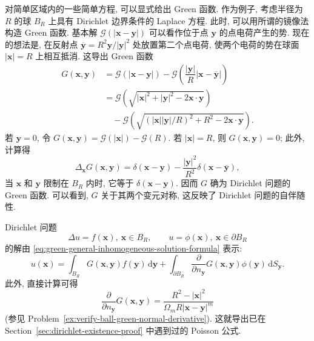 对简单区域内的一些简单方程, 可以显式给出 Green 函数. 作为例子, 考虑半径为 $R$ 的球 $B_R$ 上具有 Dirichlet 边界条件的 Laplace 方程. 此时, 可以用所谓的镜像法构造 Green 函数. 基本解 $\mathcal{G}(|\bm{x}-\bm{y}|)$ 可以看作位于点 $\bm{y}$ 的点电荷产生的势. 现在的想法是, 在反射点 $\overline{\bm{y}}=R^2\bm{y}/|\bm{y}|^2$ 处放置第二个点电荷, 使两个电荷的势在球面 $|\bm{x}|=R$ 上相互抵消. 这导出 Green 函数
\begin{equation}\label{eq:ball-dirichlet-green-image-formula}
\begin{aligned}
G(\bm{x},\bm{y})&=\mathcal{G}(|\bm{x}-\bm{y}|)-\mathcal{G}\left(\dfrac{|\bm{y}|}R|\bm{x}-\overline{\bm{y}}|\right)\\
&=\mathcal{G}\left(\sqrt{|\bm{x}|^2+|\bm{y}|^2-2\bm{x}\cdot\bm{y}}\right)\\
&\quad-\mathcal{G}\left(\sqrt{(|\bm{x}||\bm{y}|/R)^2+R^2-2\bm{x}\cdot\bm{y}}\right).
\end{aligned}
\end{equation}
若 $\bm{y}=0$, 令 $G(\bm{x},\bm{y})=\mathcal{G}(|\bm{x}|)-\mathcal{G}(R)$. 若 $|\bm{x}|=R$, 则 $G(\bm{x},\bm{y})=0$; 此外, 计算得
\begin{equation}\label{eq:ball-green-image-laplacian}
\Delta_{\bm{x}}G(\bm{x},\bm{y})=\delta(\bm{x}-\bm{y})-\dfrac{|\bm{y}|^2}{R^2}\delta(\bm{x}-\overline{\bm{y}}),
\end{equation}
当 $\bm{x}$ 和 $\bm{y}$ 限制在 $B_R$ 内时, 它等于 $\delta(\bm{x}-\bm{y})$. 因而 $G$ 确为 Dirichlet 问题的 Green 函数. 可以看到, $G$ 关于其两个变元对称, 这反映了 Dirichlet 问题的自伴随性.

Dirichlet 问题
\begin{equation}\label{eq:ball-dirichlet-poisson-boundary-problem}
\Delta u=f(\bm{x}),\ \bm{x}\in B_R,\qquad u=\phi(\bm{x}),\ \bm{x}\in\partial B_R
\end{equation}
的解由 \eqref{eq:green-general-inhomogeneous-solution-formula} 表示:
\begin{equation}\label{eq:ball-dirichlet-green-solution-representation}
u(\bm{x})=\int_{B_R}G(\bm{x},\bm{y})f(\bm{y})\,\mathrm{d}\bm{y}+\int_{\partial B_R}\dfrac{\partial}{\partial n_{\bm{y}}}G(\bm{x},\bm{y})\phi(\bm{y})\,\mathrm{d}S_{\bm{y}}.
\end{equation}
此外, 直接计算可得
\begin{equation}\label{eq:ball-green-boundary-normal-derivative}
\dfrac{\partial}{\partial n_{\bm{y}}}G(\bm{x},\bm{y})=\dfrac{R^2-|\bm{x}|^2}{\Omega_m R|\bm{x}-\bm{y}|^m}
\end{equation}
(参见 Problem~\ref{ex:verify-ball-green-normal-derivative}). 这就导出已在 Section~\ref{sec:dirichlet-existence-proof} 中遇到过的 Poisson 公式.
